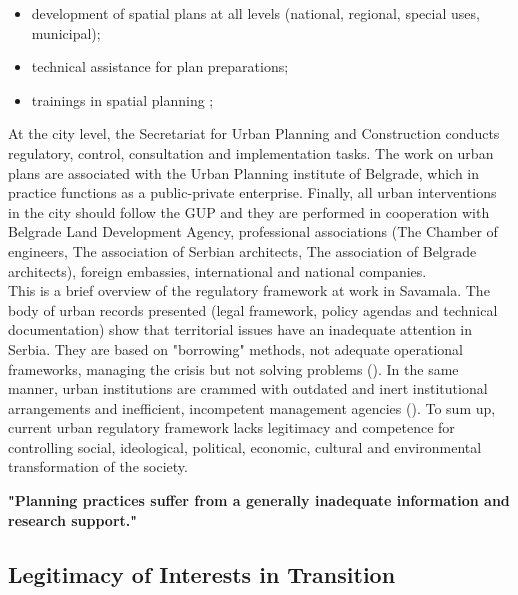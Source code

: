 \documentclass[11pt]{report}
\begin{document}
\begin{itemize}
\item development of spatial plans at all levels (national, regional, special uses, municipal);
\item technical assistance for plan preparations;
\item trainings in spatial planning ;
\end{itemize}

At the city level, the Secretariat for Urban Planning and Construction conducts regulatory, control, consultation and implementation tasks. The work on urban plans are associated with the Urban Planning institute of Belgrade, which in practice functions as a public-private enterprise. 
Finally, all urban interventions in the city should follow the GUP and they are performed in  cooperation  with  Belgrade Land Development Agency, professional  associations (The Chamber of engineers, The association of Serbian architects, The association of Belgrade architects), foreign  embassies, international and national companies.
\\
This is a brief overview of the regulatory framework at work in Savamala. 
The body of urban records presented (legal framework, policy agendas and technical documentation) show that territorial issues have an inadequate attention in Serbia.
They are based on "borrowing" methods, not adequate operational frameworks, managing the crisis but not solving problems
(\cite{adjustment of planning practice nedovic budic 2001, Vujosevic and Maricic 2012}).
In the same manner, urban institutions are crammed with outdated and inert institutional arrangements and inefficient, incompetent management agencies (\cite{Vujosevic and Maricic 2012}).
To sum up, current urban regulatory framework lacks legitimacy and competence for controlling social, ideological, political, economic, cultural and environmental transformation of the society.

\textbf{"Planning practices suffer from a generally inadequate information and research support." \cite{Vujosevic 2012}}

\subsection{Legitimacy of Interests in Transition}
\end{document}
